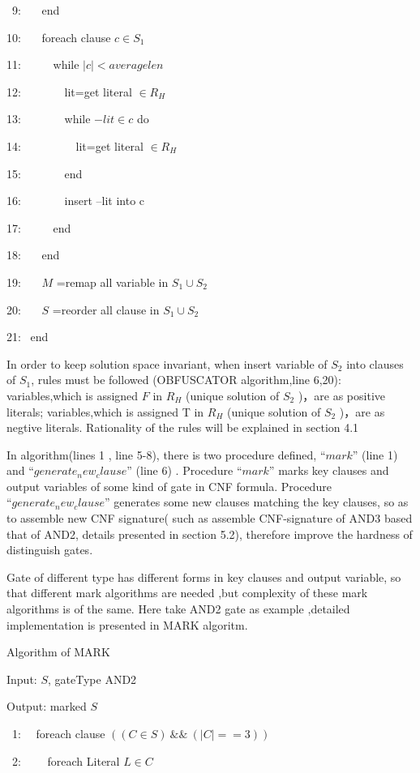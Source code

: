 \documentclass[runningheads,a4paper]{llncs}
\begin{document}
~9:~~~  end 

10:~~~  foreach clause $ c \in S_1 $

11:~~~~~	    while $ |c| < averagelen $ 

12:~~~~~~~    	 lit=get literal $\in R_H$

13:~~~~~~~    	 while $-lit \in c$ do

14:~~~~~~~~~          lit=get literal $ \in R_H $

15:~~~~~~~        end 

16:~~~~~~~	      insert –lit into c

17:~~~~~     end 

18:~~~   end 

19:~~~   $M$ =remap all variable in $ S_1 \cup S_2$

20:~~~   $S$ =reorder all clause in $S_1 \cup S_2$

21:~  end

In order to keep solution space invariant, when insert variable of $S_2$ into clauses of $S_1$, rules must be followed (OBFUSCATOR algorithm,line 6,20):
variables,which is assigned $F$ in $R_H$ (unique solution of $S_2$ )，are as positive literals;
variables,which is assigned T in $R_H$ (unique solution of $S_2$ )，are as negtive literals. 
Rationality of the rules will be explained in section 4.1

In algorithm(lines 1 , line 5-8), there is two procedure defined, $“mark”$ (line 1) and $“generate_new_clause”$ (line 6) . 
Procedure $“mark”$ marks key clauses and output variables of some kind of gate in CNF formula.
Procedure $“generate_new_clause”$ generates some new clauses matching the key clauses, so as to  assemble new CNF signature( such as assemble CNF-signature of AND3 based that of AND2, 
details presented in section 5.2), therefore improve the hardness of distinguish gates.

Gate of different type has different forms in key clauses and output variable, so that different mark algorithms are needed ,but complexity of these mark algorithms is of the same. 
Here take AND2 gate as example ,detailed implementation is presented in MARK algoritm.  

\noindent Algorithm of MARK

Input: $S$, gateType AND2

Output: marked $S$ 

~1:~~  foreach clause $((C \in S) ~\&\&~ (|C|==3))$

~2:~~~~    foreach Literal $L \in C$ 
\end{document}
